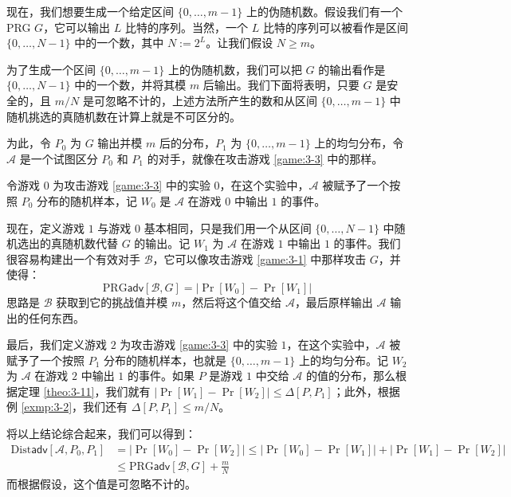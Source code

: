 \begin{example}\label{exmp:3-3}
现在，我们想要生成一个给定区间 $\{0,\dots,m-1\}$ 上的伪随机数。假设我们有一个PRG $G$，它可以输出 $L$ 比特的序列。当然，一个 $L$ 比特的序列可以被看作是区间 $\{0,\dots,N-1\}$ 中的一个数，其中 $N:=2^L$。让我们假设 $N\geq m$。

为了生成一个区间 $\{0,\dots,m-1\}$ 上的伪随机数，我们可以把 $G$ 的输出看作是 $\{0,\dots,N-1\}$ 中的一个数，并将其模 $m$ 后输出。我们下面将表明，只要 $G$ 是安全的，且 $m/N$ 是可忽略不计的，上述方法所产生的数和从区间 $\{0,\dots,m-1\}$ 中随机挑选的真随机数在计算上就是不可区分的。

为此，令 $P_0$ 为 $G$ 输出并模 $m$ 后的分布，$P_1$ 为 $\{0,\dots,m-1\}$ 上的均匀分布，令 $\mathcal A$ 是一个试图区分 $P_0$ 和 $P_1$ 的对手，就像在攻击游戏 \ref{game:3-3} 中的那样。

令游戏 $0$ 为攻击游戏 \ref{game:3-3} 中的实验 $0$，在这个实验中，$\mathcal A$ 被赋予了一个按照 $P_0$ 分布的随机样本，记 $W_0$ 是 $\mathcal A$ 在游戏 $0$ 中输出 $1$ 的事件。

现在，定义游戏 $1$ 与游戏 $0$ 基本相同，只是我们用一个从区间 $\{0,\dots,N-1\}$ 中随机选出的真随机数代替 $G$ 的输出。记 $W_1$ 为 $\mathcal A$ 在游戏 $1$ 中输出 $1$ 的事件。我们很容易构建出一个有效对手 $\mathcal{B}$，它可以像攻击游戏 \ref{game:3-1} 中那样攻击 $G$，并使得：
\[
\mathrm{PRG}\mathsf{adv}[\mathcal{B},G]
=\big\lvert
\Pr[W_0]-\Pr[W_1]
\big\rvert
\]
思路是 $\mathcal{B}$ 获取到它的挑战值并模 $m$，然后将这个值交给 $\mathcal A$，最后原样输出 $\mathcal A$ 输出的任何东西。

最后，我们定义游戏 $2$ 为攻击游戏 \ref{game:3-3} 中的实验 $1$，在这个实验中，$\mathcal A$ 被赋予了一个按照 $P_1$ 分布的随机样本，也就是 $\{0,\dots,m-1\}$ 上的均匀分布。记 $W_2$ 为 $\mathcal A$ 在游戏 $2$ 中输出 $1$ 的事件。如果 $P$ 是游戏 $1$ 中交给 $\mathcal A$ 的值的分布，那么根据定理 \ref	{theo:3-11}，我们就有 $\big\lvert\Pr[W_1]-\Pr[W_2]\big\rvert\leq\Delta[P,P_1]$；此外，根据例 \ref{exmp:3-2}，我们还有 $\Delta[P,P_1]\leq{m}/{N}$。

将以上结论综合起来，我们可以得到：
\[
\begin{aligned}
\mathrm{Dist}\mathsf{adv}[\mathcal{A},P_0,P_1]
&=\big\lvert\Pr[W_0]-\Pr[W_2]\big\rvert
\leq\big\lvert\Pr[W_0]-\Pr[W_1]\big\rvert+\big\lvert\Pr[W_1]-\Pr[W_2]\big\rvert\\
&\leq\mathrm{PRG}\mathsf{adv}[\mathcal{B},G]+\frac{m}{N}
\end{aligned}
\]
而根据假设，这个值是可忽略不计的。
\end{example}

